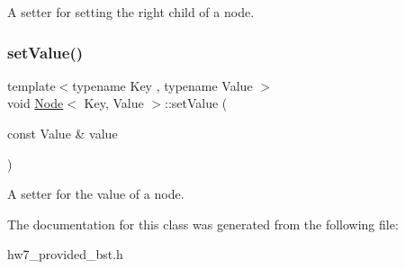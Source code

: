 A setter for setting the right child of a node. \mbox{\label{classNode_ab9b9a0da6a6b481623a3d1a7de5594a9}} 
\subsubsection{\texorpdfstring{set\+Value()}{setValue()}}
{\footnotesize\ttfamily template$<$typename Key , typename Value $>$ \\
void \mbox{\hyperlink{classNode}{Node}}$<$ Key, Value $>$\+::set\+Value (\begin{DoxyParamCaption}\item[{const Value \&}]{value }\end{DoxyParamCaption})}

A setter for the value of a node. 

The documentation for this class was generated from the following file\+:\begin{DoxyCompactItemize}
\item 
hw7\+\_\+provided\+\_\+bst.\+h\end{DoxyCompactItemize}

